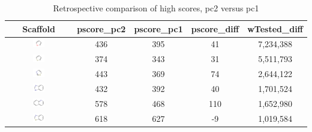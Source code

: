 \begin{table}
\caption{Retrospective comparison of high scores, pc2 versus pc1}
\begin{center}
\begin{tabular}{ |c|c|c|c|c| } 
\hline
\textbf{Scaffold} & \textbf{pscore\_pc2} & \textbf{pscore\_pc1} & \textbf{pscore\_diff} & \textbf{wTested\_diff} \\
\hline
\includegraphics[align=c,width=0.2\textwidth]{data/badapple/scaf_01.png} & 436 & 395 & 41 & 7,234,388 \\
\includegraphics[align=c,width=0.2\textwidth]{data/badapple/scaf_02.png} & 374 & 343 & 31 & 5,511,793 \\
\includegraphics[align=c,width=0.2\textwidth]{data/badapple/scaf_03.png} & 443 & 369 & 74 & 2,644,122 \\
\includegraphics[align=c,width=0.2\textwidth]{data/badapple/scaf_04.png} & 432 & 392 & 40 & 1,701,524 \\
\includegraphics[align=c,width=0.2\textwidth]{data/badapple/scaf_05.png} & 578 & 468 & 110 & 1,652,980 \\
\includegraphics[align=c,width=0.2\textwidth]{data/badapple/scaf_06.png} & 618 & 627 & -9 & 1,019,584 \\

\end{tabular}
\end{center}
\end{table}
